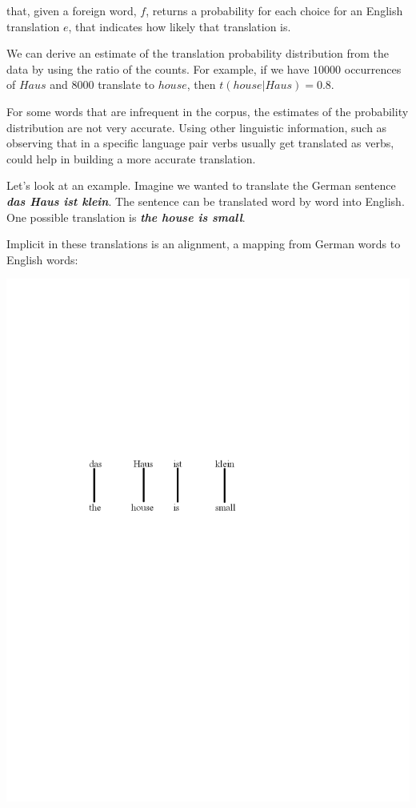 \documentclass[11pt]{book}
\theoremstyle{plain}
\begin{document}
that, given a foreign word, $f$, returns a probability for each
choice for an English translation $e$, that indicates how likely
that translation is.


We can derive an estimate of the translation probability
distribution from the data by using the ratio of the counts. For
example, if we have $10000$ occurrences of $Haus$ and $8000$
translate to $house$, then $t(house|Haus)=0.8$.

For some words that are infrequent in the corpus, the estimates of
the probability distribution are not very accurate. Using other
linguistic information, such as observing that in a specific
language pair verbs usually get translated as verbs, could help in
building a more accurate translation.

Let's look at an example. Imagine we wanted to translate the German
sentence \textbf{\emph{das Haus ist klein}}. The sentence can be
translated word by word into English. One possible translation is
\textbf{\emph{the house is small}}.


Implicit in these translations is an alignment, a mapping from
German words to English words:

\includegraphics[viewport = 100 440 400 530,clip]{constantin-figure1.pdf}
\end{document}
